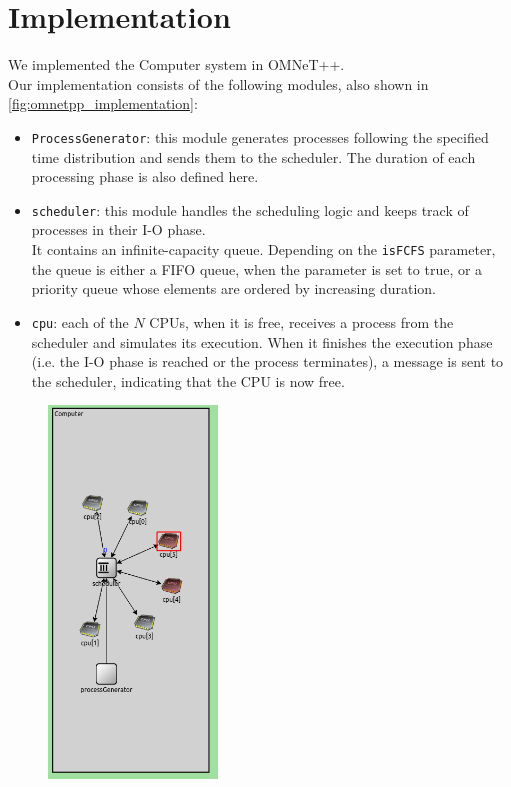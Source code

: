 \chapter{Implementation}
We implemented the Computer system in OMNeT++.\\
Our implementation consists of the following modules, also shown in \autoref{fig:omnetpp_implementation}:
\begin{itemize}
    \item \texttt{ProcessGenerator}: this module generates processes following the specified time distribution and sends them to the scheduler. The duration of each processing phase is also defined here.
    \item \texttt{scheduler}: this module handles the scheduling logic and keeps track of processes in their I-O phase.\\
    It contains an infinite-capacity queue. Depending on the \texttt{isFCFS} parameter, the queue is either a FIFO queue, when the parameter is set to true, or a priority queue whose elements are ordered by increasing duration.
    \item \texttt{cpu}: each of the $N$ CPUs, when it is free, receives a process from the scheduler and simulates its execution. When it finishes the execution phase (i.e. the I-O phase is reached or the process terminates), a message is sent to the scheduler, indicating that the CPU is now free.
\end{itemize}

\begin{figure}[H]
    \captionsetup{type=figure}
    \centering
    \includegraphics[width=0.4\textwidth]{images/example/sim_schema.png}
    \label{fig:omnetpp_implementation}
\end{figure}


